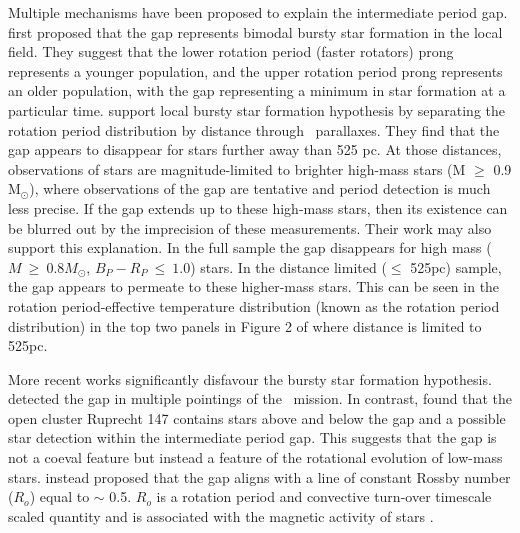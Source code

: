 Multiple mechanisms have been proposed to explain the intermediate period gap.
\citet{mcquillan_rotation_2014} first proposed that the gap represents bimodal bursty star formation in the local \kepler{} field.
They suggest that the lower rotation period (faster rotators) prong represents a younger population, and the upper rotation period prong represents an older population, with the gap representing a minimum in star formation at a particular time.
\citet{davenport_rotating_2018} support local bursty star formation hypothesis by separating the \kepler{} rotation period distribution by distance through \gaia{} \ parallaxes.
They find that the gap appears to disappear for stars further away than 525 pc.
At those distances, observations of stars are magnitude-limited to brighter high-mass stars (M $\geq$ 0.9 M$_{\odot}$), where observations of the gap are tentative and period detection is much less precise.
If the gap extends up to these high-mass stars, then its existence can be blurred out by the imprecision of these measurements.
Their work may also support this explanation.
In the full \citep{mcquillan_rotation_2014} sample the gap disappears for high mass ($M \ \geq \ 0.8 M_{\odot}$, $B_P - R_P \ \leq \ 1.0$) stars.
In the distance limited ($\leq$ 525pc) sample, the gap appears to permeate to these higher-mass stars. 
This can be seen in the rotation period-effective temperature distribution (known as the rotation period distribution) in the top two panels in Figure 2 of \citet{davenport_rotating_2018} where distance is limited to 525pc.

More recent works significantly disfavour the bursty star formation hypothesis.
\citet{gordon_stellar_2021} detected the gap in multiple pointings of the \ktoo \ mission. 
In contrast, \citet{curtis_when_2020} found that the open cluster Ruprecht 147 contains stars above and below the gap and a possible star detection within the intermediate period gap.
This suggests that the gap is not a coeval feature but instead a feature of the rotational evolution of low-mass stars.
\citet{curtis_when_2020} instead proposed that the gap aligns with a line of constant Rossby number ($R_o$) equal to $\sim$ 0.5.
$R_o$ is a rotation period and convective turn-over timescale scaled quantity and is associated with the magnetic activity of stars \citep{brun_stellar_2003,fang_stellar_2018, cao_starspots_2022}.

